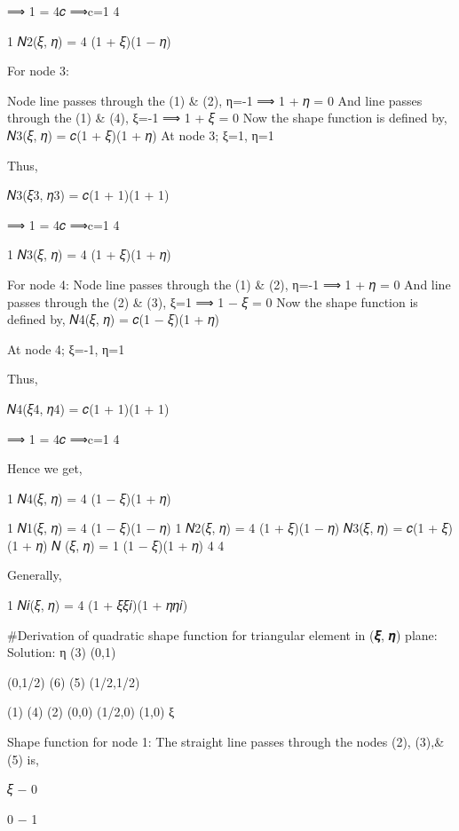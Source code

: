 {{{{{{ 
⟹ 1 = 4𝑐
⟹c=1
4
 




1
𝑁2(𝜉, 𝜂) = 4 (1 + 𝜉)(1 − 𝜂)
 


For node 3:
 
Node line passes through the (1) & (2), η=-1
⟹ 1 + 𝜂 = 0
And line passes through the (1) & (4), ξ=-1
⟹ 1 + 𝜉 = 0
Now the shape function is defined by,
𝑁3(𝜉, 𝜂) = 𝑐(1 + 𝜉)(1 + 𝜂)
At node 3; ξ=1, η=1

 
Thus,
 

𝑁3(𝜉3, 𝜂3) = 𝑐(1 + 1)(1 + 1)
 

 
⟹ 1 = 4𝑐
⟹c=1
4
 




1
𝑁3(𝜉, 𝜂) = 4 (1 + 𝜉)(1 + 𝜂)
 


For node 4:
Node line passes through the (1) & (2), η=-1
⟹ 1 + 𝜂 = 0
And line passes through the (2) & (3), ξ=1
⟹ 1 − 𝜉 = 0
Now the shape function is defined by,
𝑁4(𝜉, 𝜂) = 𝑐(1 − 𝜉)(1 + 𝜂)
 
At node 4; ξ=-1, η=1

 
Thus,
 

𝑁4(𝜉4, 𝜂4) = 𝑐(1 + 1)(1 + 1)
 

 
⟹ 1 = 4𝑐
⟹c=1
4




Hence we get,
 




1
𝑁4(𝜉, 𝜂) = 4 (1 − 𝜉)(1 + 𝜂)
 

1
𝑁1(𝜉, 𝜂) = 4 (1 − 𝜉)(1 − 𝜂)
1
𝑁2(𝜉, 𝜂) = 4 (1 + 𝜉)(1 − 𝜂)
𝑁3(𝜉, 𝜂) = 𝑐(1 + 𝜉)(1 + 𝜂)
𝑁 (𝜉, 𝜂) = 1 (1 − 𝜉)(1 + 𝜂)
4	4

 
Generally,
 

1
𝑁𝑖(𝜉, 𝜂) = 4 (1 + 𝜉𝜉𝑖)(1 + 𝜂𝜂𝑖)
 
#Derivation of quadratic shape function for triangular element in (𝝃, 𝜼) plane:
Solution:
η
(3) (0,1)




(0,1/2)  (6)	(5)	(1/2,1/2)



(1)	(4)	(2)	
(0,0)	(1/2,0)	(1,0)	ξ


Shape function for node 1:
The straight line passes through the nodes (2), (3),&(5) is,

 
𝜉 − 0

 
0 − 1
 
}}}}}}
